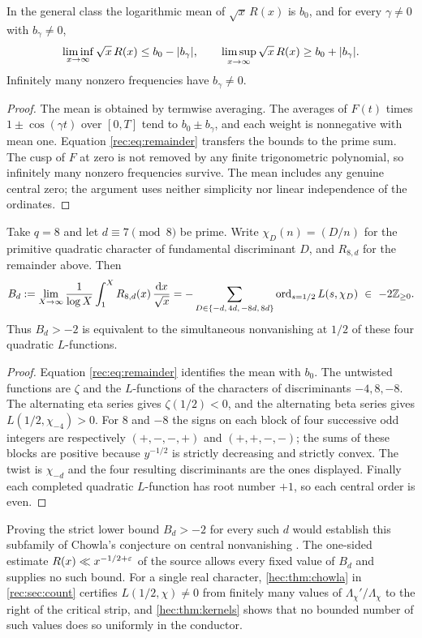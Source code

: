\begin{corollary}\label{rec:cor:oscillation}
In the general class the logarithmic mean of $\sqrt x\,R(x)$ is $b_0$, and for every
$\gamma\ne0$ with $b_\gamma\ne0$,
\[
 \liminf_{x\to\infty}\sqrt x\,R(x)\le b_0-\lvert b_\gamma\rvert,\qquad
 \limsup_{x\to\infty}\sqrt x\,R(x)\ge b_0+\lvert b_\gamma\rvert.
\]
Infinitely many nonzero frequencies have $b_\gamma\ne0$.
\end{corollary}
\begin{proof}
The mean is obtained by termwise averaging. The averages of $F(t)$ times
$1\pm\cos(\gamma t)$ over $[0,T]$ tend to $b_0\pm b_\gamma$, and each weight is nonnegative
with mean one. Equation \eqref{rec:eq:remainder} transfers the bounds to the prime sum. The
cusp of $F$ at zero is not removed by any finite trigonometric polynomial, so infinitely
many nonzero frequencies survive. The mean includes any genuine central zero; the argument
uses neither simplicity nor linear independence of the ordinates.
\end{proof}

\begin{corollary}\label{rec:cor:chowla}
Take $q=8$ and let $d\equiv7\pmod8$ be prime. Write $\chi_D(n)=(D/n)$ for the primitive
quadratic character of fundamental discriminant $D$, and $R_{8,d}$ for the remainder above.
Then
\[
 B_d:=\lim_{X\to\infty}\frac1{\log X}\int_1^XR_{8,d}(x)\,\frac{\dd x}{\sqrt x}
 =-\sum_{D\in\set{-d,\,4d,\,-8d,\,8d}}\ord_{s=1/2}L(s,\chi_D)\ \in\ -2\Z_{\ge0}.
\]
Thus $B_d>-2$ is equivalent to the simultaneous nonvanishing at $1/2$ of these four
quadratic $L$-functions.
\end{corollary}
\begin{proof}
Equation \eqref{rec:eq:remainder} identifies the mean with $b_0$. The untwisted functions
are $\zeta$ and the $L$-functions of the characters of discriminants $-4,8,-8$. The
alternating eta series gives $\zeta(1/2)<0$, and the alternating beta series gives
$L(1/2,\chi_{-4})>0$. For $8$ and $-8$ the signs on each block of four successive odd
integers are respectively $(+,-,-,+)$ and $(+,+,-,-)$; the sums of these blocks are positive
because $y^{-1/2}$ is strictly decreasing and strictly convex. The twist is $\chi_{-d}$ and
the four resulting discriminants are the ones displayed. Finally each completed quadratic
$L$-function has root number $+1$, so each central order is even.
\end{proof}

Proving the strict lower bound $B_d>-2$ for every such $d$ would establish this subfamily of
Chowla's conjecture on central nonvanishing \cite{Soundararajan2000Nonvanishing}. The
one-sided estimate $R(x)\ll x^{-1/2+\varepsilon}$ of the source allows every fixed value of $B_d$
and supplies no such bound. For a single real character, \cref{hec:thm:chowla} in \cref{rec:sec:count}
certifies $L(1/2,\chi)\ne0$ from finitely many values of $\Lambda_\chi'/\Lambda_\chi$ to the right of the
critical strip, and \cref{hec:thm:kernels} shows that no bounded number of such values does so uniformly
in the conductor.

